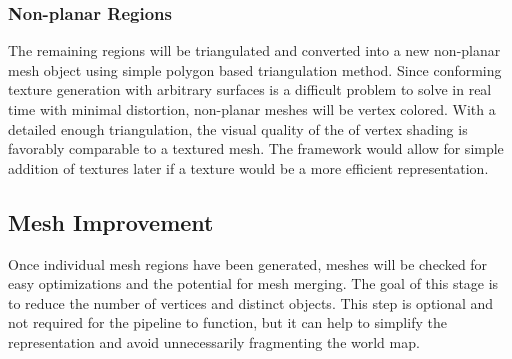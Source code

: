 \subsubsection{Non-planar Regions}
The remaining regions will be triangulated and converted into a new non-planar mesh object using simple polygon based triangulation method. Since conforming texture generation with arbitrary surfaces is a difficult problem to solve in real time with minimal distortion, non-planar meshes will be vertex colored. With a detailed enough triangulation, the visual quality of the of vertex shading is favorably comparable to a textured mesh. The framework would allow for simple addition of textures later if a texture would be a more efficient representation.

\subsection{Mesh Improvement}
Once individual mesh regions have been generated, meshes will be checked for easy optimizations and the potential for mesh merging. The goal of this stage is to reduce the number of vertices and distinct objects. This step is optional and not required for the pipeline to function, but it can help to simplify the representation and avoid unnecessarily fragmenting the world map. 

